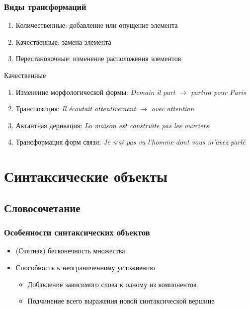\begin{frame}
  \frametitle{Виды трансформаций}

  \begin{enumerate}
    \item Количественные: добавление или опущение элемента
    \item Качественные: замена элемента
    \item Перестановочные: изменение расположения элементов
  \end{enumerate}

  \vfill

  \begin{block}{Качественные}
    \begin{enumerate}
      \item Изменение морфологической формы: \textit{Demain il part $\rightarrow$ partira pour Paris}
      \item Транспозиция: \textit{Il écoutait attentivement $\rightarrow$ avec attention}
      \item Актантная деривация: \textit{La maison est construite pas les ouvriers}
      \item Трансформация форм связи: \textit{Je n'ai pas vu l'homme dont vous m'avez parlé}
    \end{enumerate}
  \end{block}
\end{frame}

\section{Синтаксические объекты}

\subsection{Словосочетание}

\begin{frame}
  \frametitle{Особенности синтаксических объектов}

  \begin{itemize}
    \item (Счетная) бесконечность множества
    \item Способность к неограниченному усложнению \begin{itemize}
      \item Добавление зависимого слова к одному из компонентов
      \item Подчинение всего выражения новой синтаксической вершине
    \end{itemize}
  \end{itemize}
\end{frame}

